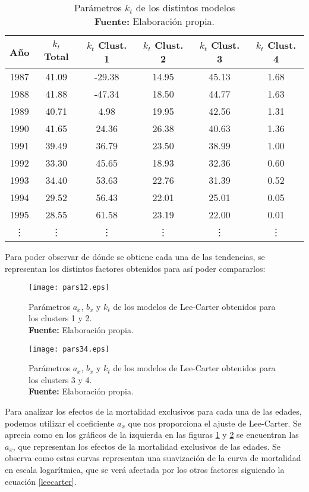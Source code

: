 \documentclass{article}
\begin{document}
\begin{table}[H]
\centering
\begin{tabular}{c|c|cccc}
 \textbf{Año} & $k_{t}$ Total & $k_{t}$ Clust. 1  & $k_{t}$ Clust. 2 & $k_{t}$ Clust. 3 & $k_{t}$ Clust. 4 \\ 
  \hline
1987 & 41.09 & -29.38 & 14.95 & 45.13 & 1.68 \\ 
  1988 & 41.88 & -47.34 & 18.50 & 44.77 & 1.63 \\ 
  1989 & 40.71 & 4.98 & 19.95 & 42.56 & 1.31 \\ 
  1990 & 41.65 & 24.36 & 26.38 & 40.63 & 1.36 \\ 
  1991 & 39.49 & 36.79 & 23.50 & 38.99 & 1.00 \\ 
  1992 & 33.30 & 45.65 & 18.93 & 32.36 & 0.60 \\ 
  1993 & 34.40 & 53.63 & 22.76 & 31.39 & 0.52 \\ 
  1994 & 29.52 & 56.43 & 22.01 & 25.01 & 0.05 \\ 
  1995 & 28.55 & 61.58 & 23.19 & 22.00 & 0.01 \\ 
\vdots&\vdots&\vdots&\vdots&\vdots&\vdots
\end{tabular}
\caption{Parámetros $k_{t}$ de los distintos modelos\\ \textbf{Fuente:} Elaboración propia.}
\end{table}



Para poder observar de dónde se obtiene cada una de las tendencias, se representan los distintos factores obtenidos para así poder compararlos:


\begin{figure}[H]
\centering
\texttt{[image: pars12.eps]}
\caption{\centering Parámetros $a_{x}$, $b_{x}$ y $k_{t}$ de los modelos de Lee-Carter obtenidos para los clusters 1 y 2. \\ \textbf{Fuente:} Elaboración propia.}
\label{params12}
\end{figure}

\begin{figure}[H]
\centering
\texttt{[image: pars34.eps]}
\caption{\centering Parámetros $a_{x}$, $b_{x}$ y $k_{t}$ de los modelos de Lee-Carter obtenidos para los clusters 3 y 4. \\ \textbf{Fuente:} Elaboración propia.}
\label{params34}
\end{figure}

Para analizar los efectos de la mortalidad exclusivos para cada una de las edades, podemos utilizar el coeficiente $a_{x}$ que nos proporciona el ajuste de Lee-Carter.
Se aprecia como en los gráficos de la izquierda en las figuras \ref{params12} y \ref{params34} se encuentran las $a_{x}$, que representan los efectos de la mortalidad exclusivos de las edades. Se observa como estas curvas representan una suavización de la curva de mortalidad en escala logarítmica, que se verá afectada por los otros factores siguiendo la ecuación \ref{leecarter}.
\end{document}
